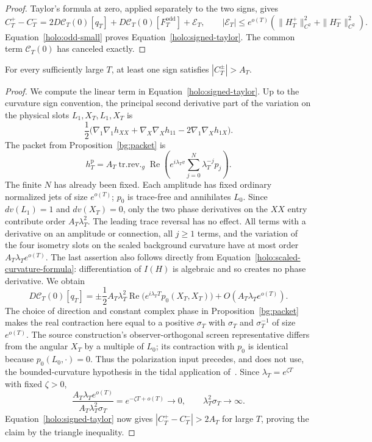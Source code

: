 \begin{proof}
Taylor's formula at zero, applied separately to the two signs,
gives
\[
 C_T^+-C_T^-
 =2D\mathcal C_T(0)[q_T]
       +D\mathcal C_T(0)[F_T^{\mathrm{odd}}]+\mathcal E_T,
 \qquad
 |\mathcal E_T|\leq e^{o(T)}
       (\|H_T^+\|_{C^2}^2+\|H_T^-\|_{C^2}^2).
\]
Equation~\eqref{holo:odd-small} proves
Equation~\eqref{holo:signed-taylor}.  The common term
$\mathcal C_T(0)$ has canceled exactly.
\end{proof}

\begin{proposition}
\label{holo:signal}
For every sufficiently large $T$, at least one sign satisfies
$|C_T^\pm|>A_T$.
\end{proposition}

\begin{proof}
We compute the linear term in Equation~\eqref{holo:signed-taylor}.
Up to the curvature sign convention, the principal second derivative
part of the variation on the physical slots $L_1,X_T,L_1,X_T$ is
\[
 \frac12\bigl(\nabla_1\nabla_1 h_{XX}
              +\nabla_X\nabla_X h_{11}
              -2\nabla_1\nabla_X h_{1X}\bigr).
\]
The packet from Proposition~\ref{bg:packet} is
\[
 h_T^{\mathrm p}
   =A_T\operatorname{tr.rev.}_g\operatorname{Re}
       \left(e^{i\lambda_T v}
                    \sum_{j=0}^{N}\lambda_T^{-j}p_j\right).
\]
The finite $N$ has already been fixed.  Each amplitude has fixed
ordinary normalized jets of size $e^{o(T)}$; $p_0$ is trace-free
and annihilates $L_0$.  Since $dv(L_1)=1$ and $dv(X_T)=0$, only
the two phase derivatives on the $XX$ entry contribute order
$A_T\lambda_T^2$.  The leading trace reversal has no effect.
All terms with a derivative on an amplitude or connection, all
$j\geq1$ terms, and the variation of the four isometry slots on
the scaled background curvature have at most order
$A_T\lambda_T e^{o(T)}$.  The last assertion also follows directly
from Equation~\eqref{holo:scaled-curvature-formula}: differentiation
of $I(H)$ is algebraic and so creates no phase derivative.
We obtain
\begin{equation}\label{holo:linear-signal}
 D\mathcal C_T(0)[q_T]
   =\pm\frac12 A_T\lambda_T^2
       \operatorname{Re}\bigl(e^{i\lambda_TT}p_0(X_T,X_T)\bigr)
       +O(A_T\lambda_T e^{o(T)}).
\end{equation}
The choice of direction and constant complex phase in
Proposition~\ref{bg:packet} makes the real contraction here equal to a
positive $\sigma_T$ with $\sigma_T$ and $\sigma_T^{-1}$ of size
$e^{o(T)}$.  The source construction's observer-orthogonal screen
representative differs from the angular $X_T$ by a multiple of
$L_0$; its contraction with $p_0$ is identical because
$p_0(L_0,\cdot)=0$.  Thus the polarization input precedes, and does
not use, the bounded-curvature hypothesis in the tidal application
of~\cite[]{Foundation}.
Since $\lambda_T=e^{\zeta T}$ with fixed $\zeta>0$,
\[
 \frac{A_T\lambda_T e^{o(T)}}{A_T\lambda_T^2\sigma_T}
      =e^{-\zeta T+o(T)}\longrightarrow0,
 \qquad \lambda_T^2\sigma_T\longrightarrow\infty.
\]
Equation~\eqref{holo:signed-taylor} now gives
$|C_T^+-C_T^-|>2A_T$ for large $T$, proving the claim by the
triangle inequality.
\end{proof}

